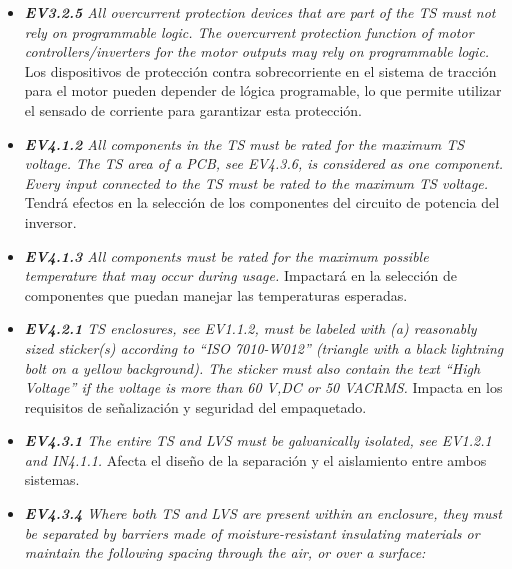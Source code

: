 \begin{itemize}
    \item \textit{\textbf{EV3.2.5} All overcurrent protection devices that are part of the TS must not rely on programmable logic. The overcurrent protection function of motor controllers/inverters for the motor outputs may rely on programmable logic.} Los dispositivos de protección contra sobrecorriente en el sistema de tracción para el motor pueden depender de lógica programable, lo que permite utilizar el sensado de corriente para garantizar esta protección.
    \item \textit{\textbf{EV4.1.2} All components in the TS must be rated for the maximum TS voltage. The TS area of a PCB, see EV4.3.6, is considered as one component. Every input connected to the TS must be rated to the maximum TS voltage.} Tendrá efectos en la selección de los componentes del circuito de potencia del inversor.
    \item \textit{\textbf{EV4.1.3}  All components must be rated for the maximum possible temperature that may occur during usage.} Impactará en la selección de componentes que puedan manejar las temperaturas esperadas.
    \item \textit{\textbf{EV4.2.1} TS enclosures, see EV1.1.2, must be labeled with (a) reasonably sized sticker(s) according to “ISO 7010-W012” (triangle with a black lightning bolt on a yellow background). The sticker must also contain the text “High Voltage” if the voltage is more than 60 V,DC or 50 VACRMS.} Impacta en los requisitos de señalización y seguridad del empaquetado.
    \item \textit{\textbf{EV4.3.1} The entire TS and LVS must be galvanically isolated, see EV1.2.1 and IN4.1.1.} Afecta el diseño de la separación y el aislamiento entre ambos sistemas.
    \item \textit{\textbf{EV4.3.4} Where both TS and LVS are present within an enclosure, they must be separated by barriers made of moisture-resistant insulating materials or maintain the following spacing through the air, or over a surface:}


\end{itemize}

